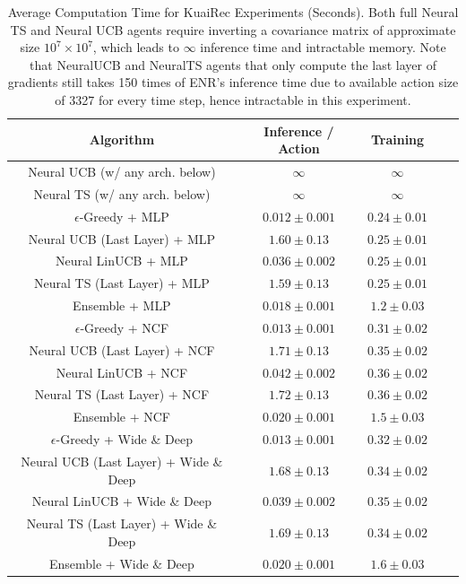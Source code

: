 \begin{table}[t!]
\small
  \caption{Average Computation Time for KuaiRec Experiments (Seconds). Both full Neural TS and Neural UCB agents require inverting a covariance matrix of approximate size $10^{7} \times 10^{7}$, which leads to $\infty$ inference time and intractable memory. Note that NeuralUCB and NeuralTS agents that only compute the last layer of gradients still takes 150 times of ENR's inference time due to available action size of 3327 for every time step, hence intractable in this experiment.}
  \vspace{-0.1in}
  \label{tab:kuai_comp}
  \begin{tabular}{ccccc}
    \toprule
    Algorithm & Inference / Action & Training\\
    \midrule
    Neural UCB (w/ any arch. below) & $\infty$ & $\infty$\\
    Neural TS (w/ any arch. below) & $\infty$ & $\infty$\\
    \midrule
    $\epsilon$-Greedy + MLP & $0.012 \pm 0.001$ & $0.24 \pm 0.01$\\
    Neural UCB (Last Layer) + MLP & $1.60 \pm 0.13$ & $0.25 \pm 0.01$\\
    Neural LinUCB + MLP & $0.036 \pm 0.002$ & $0.25 \pm 0.01$\\
    Neural TS (Last Layer) + MLP & $1.59 \pm 0.13$ & $0.25 \pm 0.01$\\
    Ensemble + MLP & $0.018 \pm 0.001$ & $1.2 \pm 0.03$\\
    \midrule
    $\epsilon$-Greedy + NCF & $0.013 \pm 0.001$ & $0.31 \pm 0.02$\\
    Neural UCB (Last Layer) + NCF & $1.71 \pm 0.13$ & $0.35 \pm 0.02$\\
    Neural LinUCB + NCF & $0.042 \pm 0.002$ & $0.36 \pm 0.02$\\
    Neural TS (Last Layer) + NCF & $1.72 \pm 0.13$ & $0.36 \pm 0.02$\\
    Ensemble + NCF & $0.020 \pm 0.001$ & $1.5 \pm 0.03$\\
    \midrule
    $\epsilon$-Greedy + Wide \& Deep & $0.013 \pm 0.001$ & $0.32 \pm 0.02$\\
    Neural UCB (Last Layer) + Wide \& Deep & $1.68 \pm 0.13$ & $0.34 \pm 0.02$\\
    Neural LinUCB + Wide \& Deep & $0.039 \pm 0.002$ & $0.35 \pm 0.02$\\
    Neural TS (Last Layer) + Wide \& Deep & $1.69 \pm 0.13$ & $0.34 \pm 0.02$\\
    Ensemble + Wide \& Deep & $0.020 \pm 0.001$ & $1.6 \pm 0.03$\\
    

\end{tabular}
\end{table}
